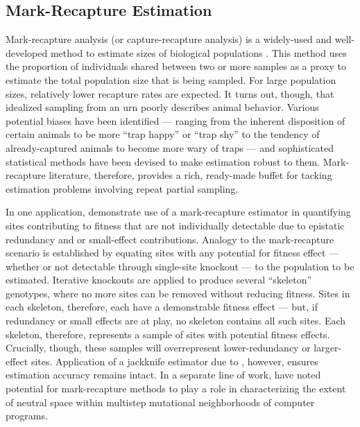 \subsection{Mark-Recapture Estimation}

Mark-recapture analysis (or capture-recapture analysis) is a widely-used and well-developed method to estimate sizes of biological populations \citep{amstrup2010handbook}.
This method uses the proportion of individuals shared between two or more samples as a proxy to estimate the total population size that is being sampled.
For large population sizes, relatively lower recapture rates are expected.
It turns out, though, that idealized sampling from an urn poorly describes animal behavior.
Various potential biases have been identified --- ranging from the inherent disposition of certain animals to be more ``trap happy'' or ``trap shy'' to the tendency of already-captured animals to become more wary of traps --- and sophisticated statistical methods have been devised to make estimation robust to them.
Mark-recapture literature, therefore, provides a rich, ready-made buffet for tacking estimation problems involving repeat partial sampling.

In one application, \citet{moreno2024methods} demonstrate use of a mark-recapture estimator in quantifying sites contributing to fitness that are not individually detectable due to epistatic redundancy and or small-effect contributions.
Analogy to the mark-recapture scenario is established by equating sites with any potential for fitness effect --- whether or not detectable through single-site knockout --- to the population to be estimated.
Iterative knockouts are applied to produce several ``skeleton'' genotypes, where no more sites can be removed without reducing fitness.
Sites in each skeleton, therefore, each have a demonstrable fitness effect --- but, if redundancy or small effects are at play, no skeleton contains all such sites.
Each skeleton, therefore, represents a sample of sites with potential fitness effects.
Crucially, though, these samples will overrepresent lower-redundancy or larger-effect sites.
Application of a jackknife estimator due to \citet{burnham1979robust}, however, ensures estimation accuracy remains intact.
In a separate line of work, \citet{schulte2014software} have noted potential for mark-recapture methods to play a role in characterizing the extent of neutral space within multistep mutational neighborhoods of computer programs.
